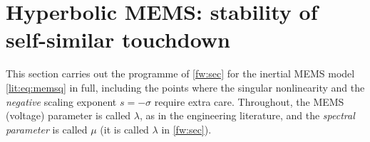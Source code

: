 \section{Hyperbolic MEMS: stability of self-similar touchdown}
\label{mems:sec}

This section carries out the programme of \cref{fw:sec} for the inertial
MEMS model \eqref{lit:eq:memsq} in full, including the points where the
singular nonlinearity and the \emph{negative} scaling exponent $s=-\sigma$
require extra care. Throughout, the MEMS (voltage) parameter is called
$\lambda$, as in the engineering literature, and the \emph{spectral parameter}
is called $\mu$ (it is called $\lambda$ in \cref{fw:sec}).


